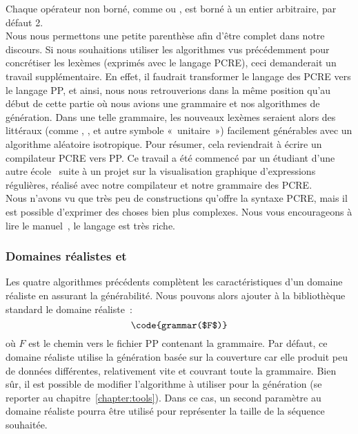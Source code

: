 Chaque opérateur non borné, comme \code{*} ou \code{+}, est borné à un entier
arbitraire, par défaut 2. \\

Nous nous permettons une petite parenthèse afin d'être complet dans notre
discours. Si nous souhaitions utiliser les algorithmes vus précédemment pour
concrétiser les lexèmes (exprimés avec le langage PCRE), ceci demanderait un
travail supplémentaire. En effet, il faudrait transformer le langage des PCRE
vers le langage PP, et ainsi, nous nous retrouverions dans la même position
qu'au début de cette partie où nous avions une grammaire et nos algorithmes de
génération. Dans une telle grammaire, les nouveaux lexèmes seraient alors des
littéraux (comme , ,  et autre symbole «~unitaire~»)
facilement générables avec un algorithme aléatoire isotropique. Pour résumer,
cela reviendrait à écrire un compilateur PCRE vers PP. Ce travail a été commencé
par un étudiant d'une autre école~ suite à un projet sur la
visualisation graphique d'expressions régulières, réalisé avec notre compilateur
et notre grammaire des PCRE. \\

Nous n'avons vu que très peu de constructions qu'offre la syntaxe PCRE, mais il
est possible d'exprimer des choses bien plus complexes. Nous vous encourageons à
lire le manuel~, le langage est très riche.

\subsubsection{Domaines réalistes  et }

Les quatre algorithmes précédents complètent les caractéristiques d'un domaine
réaliste en assurant la générabilité. Nous pouvons alors ajouter à la
bibliothèque standard le domaine réaliste~:
%
$$\code{grammar($F$)}$$
%
où $F$ est le chemin vers le fichier PP contenant la grammaire. Par défaut, ce
domaine réaliste utilise la génération basée sur la couverture car elle produit
peu de données différentes, relativement vite et couvrant toute la grammaire.
Bien sûr, il est possible de modifier l'algorithme à utiliser pour la génération
(se reporter au chapitre~\ref{chapter:tools}). Dans ce cas, un second paramètre
au domaine réaliste pourra être utilisé pour représenter la taille de la
séquence souhaitée.

